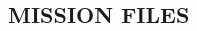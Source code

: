 \documentclass[Space_Shuttle_Ultra_Manual.tex]{subfiles}
\begin{document}
\begin{multicols}{2}
\section{MISSION FILES}
\label{sec:mission-files}

\end{multicols}
\end{document}
